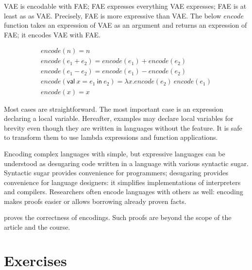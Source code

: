 VAE is encodable with FAE; FAE expresses everything VAE expresses; FAE is at
least as  as VAE. Precisely, FAE is more expressive than VAE.
The below \(\mathit{encode}\) function takes an expression of VAE as an argument
and returns an expression of FAE; it encodes VAE with FAE.

\[
\begin{array}{l}
\mathit{encode}(n)=n \\
\mathit{encode}(e_1+e_2)=\mathit{encode}(e_1)+\mathit{encode}(e_2) \\
\mathit{encode}(e_1-e_2)=\mathit{encode}(e_1)-\mathit{encode}(e_2) \\
\mathit{encode}(\textsf{val}\ x = e_1\ \textsf{in}\ e_2)=
\lambda x.\mathit{encode}(e_2)\ \mathit{encode}(e_1) \\
\mathit{encode}(x)=x
\end{array}
\]

Most cases are straightforward. The most important case is an expression
declaring a local variable. Hereafter, examples may declare local variables for
brevity even though they are written in languages without the feature. It is safe
to transform them to use lambda expressions and function applications.

Encoding complex languages with simple, but expressive languages can be
understood as desugaring code written in a language with various syntactic sugar.
Syntactic sugar provides convenience for programmers; desugaring provides
convenience for language designers: it simplifies implementations of interpreters
and compilers. Researchers often encode languages with others as well: encoding
makes proofs easier or allows borrowing already proven facts.

 proves the correctness of encodings. Such proofs are
beyond the scope of the article and the course.

\section{Exercises}

